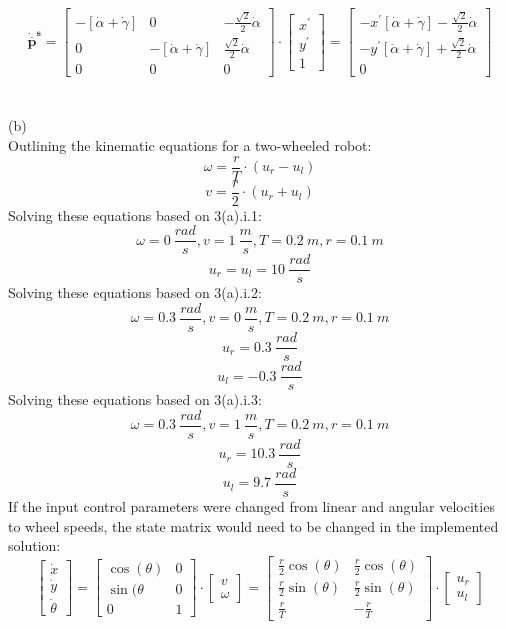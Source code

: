 \documentclass{article}
\begin{document}
\[
\bm{\mathbf{\dot{\overline{p}}^s}} = \begin{bmatrix}
    -\left[ \dot{\alpha} + \dot{\gamma} \right] & 0 & -\frac{\sqrt{2}}{2}\dot{\alpha} \\
    0 & -\left[ \dot{\alpha} + \dot{\gamma} \right] & \frac{\sqrt{2}}{2}\dot{\alpha} \\
    0 & 0 & 0
\end{bmatrix} \cdot \begin{bmatrix}
    x^{'} \\ y^{'} \\ 1
\end{bmatrix} = \begin{bmatrix}
    -x^{'}\left[ \dot{\alpha} + \dot{\gamma} \right] - \frac{\sqrt{2}}{2}\dot{\alpha} \\
    -y^{'}\left[ \dot{\alpha} + \dot{\gamma} \right] + \frac{\sqrt{2}}{2}\dot{\alpha} \\
    0
\end{bmatrix}
\]
\newpage
\section{}
(b)
\[\]
Outlining the kinematic equations for a two-wheeled robot:
\[
\omega = \frac{r}{T} \cdot (u_r - u_l)
\]
\[
v = \frac{r}{2} \cdot (u_r + u_l)
\]
Solving these equations based on 3(a).i.1:
\[
\omega = 0 \ \frac{rad}{s}, v = 1 \ \frac{m}{s}, T = 0.2 \ m, r = 0.1 \ m
\]
\[
u_r = u_l = 10 \ \frac{rad}{s}
\]
\[\]
Solving these equations based on 3(a).i.2:
\[
\omega = 0.3 \ \frac{rad}{s}, v = 0 \ \frac{m}{s}, T = 0.2 \ m, r = 0.1 \ m
\]
\[
u_r = 0.3 \ \frac{rad}{s}
\]
\[
u_l = -0.3 \ \frac{rad}{s}
\]
Solving these equations based on 3(a).i.3:
\[
\omega = 0.3 \ \frac{rad}{s}, v = 1 \ \frac{m}{s}, T = 0.2 \ m, r = 0.1 \ m
\]
\[
u_r = 10.3 \ \frac{rad}{s}
\]
\[
u_l = 9.7 \ \frac{rad}{s}
\]
\[\]
If the input control parameters were changed from linear and angular velocities to wheel speeds, the state matrix would need to be changed in the implemented solution:
\[
\begin{bmatrix}
    \dot{x} \\ \dot{y} \\ \dot{\theta}
\end{bmatrix} = 
\begin{bmatrix}
    \cos(\theta) & 0 \\ \sin(\theta & 0 \\ 0 & 1
\end{bmatrix} \cdot
\begin{bmatrix}
    v \\ \omega
\end{bmatrix} = \begin{bmatrix}
    \frac{r}{2}\cos(\theta) & \frac{r}{2}\cos(\theta) \\ \frac{r}{2}\sin(\theta) & \frac{r}{2}\sin(\theta) \\ \frac{r}{T} & -\frac{r}{T}
\end{bmatrix} \cdot \begin{bmatrix}
    u_r \\ u_l
\end{bmatrix}
\]
\newpage
\end{document}

